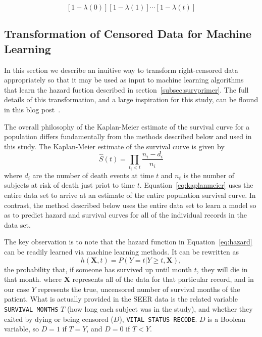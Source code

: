 \documentclass[a4paper,11pt]{article}
\newcommand{\codewhite}[1]{\colorbox{white}{\texttt{#1}}}
\begin{document}
\begin{equation}
\label{eq:hazardtosurvival}
[ 1 - \lambda(0)][1 - \lambda(1)] \cdots [1 - \lambda(t)]
\end{equation}


\subsection{Transformation of Censored Data for Machine Learning}
\label{subsec:transformation}

In this section we describe an inuitive way to transform right-censored data appropriately so that it may be used as input to machine learning algorithms that learn the hazard fuction described in section~\ref{subsec:survprimer}. The full details of this transformation, and a large inspiration for this study, can be flound in this blog post~\cite{kuhn}.

The overall philosophy of the Kaplan-Meier estimate of the survival curve for a population differs fundamentally from the methods described below and used in this study. 
The Kaplan-Meier estimate of the survival curve is given by
\begin{equation}
\label{eq:kaplanmeier}
\hat{S}(t) = \prod_{t_i < t} \frac{n_i - d_i}{n_i}
\end{equation}
where $d_i$ are the number of death events at time $t$ and $n_t$ is the number of subjects at risk of death just priot to time $t$. 
Equation~\ref{eq:kaplanmeier} uses the entire data set to arrive at an estimate of the entire population survival curve. In contrast, the method described below uses the entire data set to learn a model so as to predict hazard and survival curves for all of the individual records in the data set.

The key observation is to note that the hazard function in Equation~\ref{eq:hazard} can be readily learned via machine learning methods. It can be rewritten as
\begin{equation}
\label{eq:hhazard}
h(\mathbf{X}, t) = P(Y = t|Y \geq t, \mathbf{X}),
\end{equation}
the probability that, if someone has survived up until month $t$, they will die in that month.
where $\mathbf{X}$ represents all of the data for that particular record, and in our case $Y$ represents the true, uncensored number of survival months of the patient.
What is actually provided in the SEER data is the related variable \codewhite{SURVIVAL MONTHS} $T$ (how long each subject was in the study), and whether they exited by dying or being censored ($D$), \codewhite{VITAL STATUS RECODE}. 
$D$ is a Boolean variable, so $D = 1$ if $T = Y$, and $D = 0$ if $T < Y$.
\end{document}
